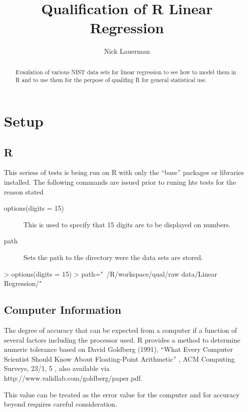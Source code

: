 \documentclass[10pt]{article}
\title{Qualification of R Linear Regression}
\author{Nick Lauerman}
\begin{document}

\maketitle

\begin{abstract}
Evaulation of various NIST data sets for linear regression to see how to model
them in R and to use them for the perpose of qualifing R for general statistical
use.
\end{abstract}

\tableofcontents

\section{Setup}
\subsection{R}
This seriess of tests is being run on R with only the ``base'' packages or libraries
installed. The following commands are issued prior to runing hte tests for the 
reason stated

\begin{description}
   \item[options(digits = 15)] This is used to specify that 15 digits are to be displayed
   on numbers.
   \item[path] Sets the path to the directory were the data sets are stored.
\end{description}
\begin{Schunk}
\begin{Sinput}
> options(digits = 15)
> path="~/R/workspace/qual/raw data/Linear Regression/"
\end{Sinput}
\end{Schunk}
\subsection{Computer Information}
The degree of accuracy  that can be expected from a computer if a function of several
factors including the processor used. R provides a method to determine numeric tolerance based on 
David Goldberg (1991), ``What Every Computer Scientist Should Know About Floating-Point Arithmetic''
, ACM Computing Surveys, 23/1, 5 , also available via http://www.validlab.com/goldberg/paper.pdf.

This value can be treated as the error value for the computer and for accuracy beyond requires careful
consideration.
\end{document}
